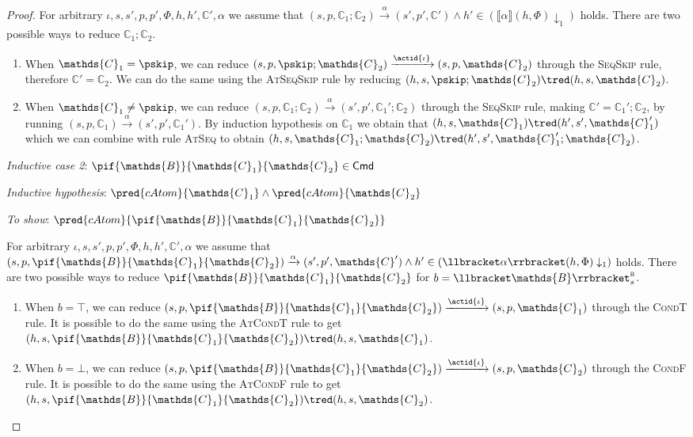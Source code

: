 {\begin{proof}
For arbitrary $\iota, s, s', p, p', \Phi, h, h', \mathds{C}', \alpha$ we assume that $(s, p, \mathds{C}_1 ; \mathds{C}_2) \xrightarrow{\alpha} (s', p', \mathds{C}') \land h' \in \left( \llbracket \alpha \rrbracket(h, \Phi) \downarrow_1 \right)$ holds. There are two possible ways to reduce $\mathds{C}_1 ; \mathds{C}_2$.
\begin{enumerate}
\item When $\mathds{C}_1 = \pskip$, we can reduce $(s, p, \pskip ; \mathds{C}_2) \xrightarrow{\actid{\iota}} (s, p, \mathds{C}_2)$ through the \textsc{SeqSkip} rule, therefore $\mathds{C}' = \mathds{C}_2$. We can do the same using the \textsc{AtSeqSkip} rule by reducing $(h, s, \pskip ; \mathds{C}_2) \tred (h, s, \mathds{C}_2)$.
\item When $\mathds{C}_1 \neq \pskip$, we can reduce $(s, p, \mathds{C}_1 ; \mathds{C}_2) \xrightarrow{\alpha} (s', p', \mathds{C}_1' ; \mathds{C}_2)$ through the \textsc{SeqSkip} rule, making $\mathds{C}' = \mathds{C}_1'; \mathds{C}_2$, by running $(s, p, \mathds{C}_1) \xrightarrow{\alpha} (s', p', \mathds{C}_1')$. By induction hypothesis on $\mathds{C}_1$ we obtain that $(h, s, \mathds{C}_1) \tred (h', s', \mathds{C}_1')$ which we can combine with rule \textsc{AtSeq} to obtain $(h, s, \mathds{C}_1 ; \mathds{C}_2) \tred (h', s', \mathds{C}_1' ; \mathds{C}_2)$. \\
\end{enumerate}

\textit{Inductive case 2}: $\pif{\mathds{B}}{\mathds{C}_1}{\mathds{C}_2} \in \mathsf{Cmd}$

\textit{Inductive hypothesis}: $\pred{cAtom}{\mathds{C}_1} \land \pred{cAtom}{\mathds{C}_2}$

\textit{To show}: $\pred{cAtom}{\pif{\mathds{B}}{\mathds{C}_1}{\mathds{C}_2}}$

For arbitrary $\iota, s, s', p, p', \Phi, h, h', \mathds{C}', \alpha$ we assume that $(s, p, \pif{\mathds{B}}{\mathds{C}_1}{\mathds{C}_2}) \xrightarrow{\alpha} (s', p', \mathds{C}') \land h' \in \left( \llbracket \alpha \rrbracket(h, \Phi) \downarrow_1 \right)$ holds. There are two possible ways to reduce $\pif{\mathds{B}}{\mathds{C}_1}{\mathds{C}_2}$ for $b = \llbracket \mathds{B} \rrbracket_{s}^{\textsc{b}}$.
\begin{enumerate}
\item When $b = \top$, we can reduce $(s, p, \pif{\mathds{B}}{\mathds{C}_1}{\mathds{C}_2}) \xrightarrow{\actid{\iota}} (s, p, \mathds{C}_1)$ through the \textsc{CondT} rule. It is possible to do the same using the \textsc{AtCondT} rule to get $(h, s, \pif{\mathds{B}}{\mathds{C}_1}{\mathds{C}_2}) \tred (h, s, \mathds{C}_1)$.
\item When $b = \bot$, we can reduce $(s, p, \pif{\mathds{B}}{\mathds{C}_1}{\mathds{C}_2}) \xrightarrow{\actid{\iota}} (s, p, \mathds{C}_2)$ through the \textsc{CondF} rule. It is possible to do the same using the \textsc{AtCondF} rule to get $(h, s, \pif{\mathds{B}}{\mathds{C}_1}{\mathds{C}_2}) \tred (h, s, \mathds{C}_2)$.
\end{enumerate}


\end{proof}}
